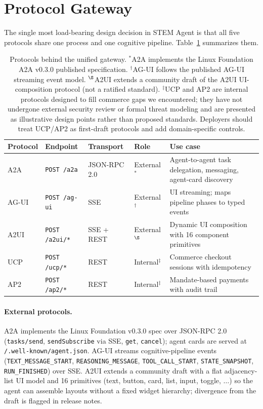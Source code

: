 \documentclass[11pt]{article}
\begin{document}
\section{Protocol Gateway}
\label{sec:protocols}

The single most load-bearing design decision in STEM Agent is that all five protocols share one process and one cognitive pipeline. Table~\ref{tab:protocols} summarizes them.

\begin{table}[t]
  \small
  \centering
  \begin{tabular}{llllp{5.5cm}}
    \toprule
    Protocol & Endpoint & Transport & Role & Use case \\
    \midrule
    A2A  & \texttt{POST /a2a}          & JSON-RPC 2.0 & External$^{\ast}$ & Agent-to-agent task delegation, messaging, agent-card discovery \\
    AG-UI & \texttt{POST /ag-ui}        & SSE           & External$^{\dagger}$ & UI streaming; maps pipeline phases to typed events \\
    A2UI & \texttt{POST /a2ui/*}       & SSE + REST    & External$^{\S}$ & Dynamic UI composition with 16 component primitives \\
    UCP  & \texttt{POST /ucp/*}        & REST          & Internal$^{\ddagger}$ & Commerce checkout sessions with idempotency \\
    AP2  & \texttt{POST /ap2/*}        & REST          & Internal$^{\ddagger}$ & Mandate-based payments with audit trail \\
    \bottomrule
  \end{tabular}
  \caption{Protocols behind the unified gateway. $^{\ast}$A2A implements the Linux Foundation A2A v0.3.0 published specification. $^{\dagger}$AG-UI follows the published AG-UI streaming event model. $^{\S}$A2UI extends a community draft of the A2UI UI-composition protocol (not a ratified standard). $^{\ddagger}$UCP and AP2 are internal protocols designed to fill commerce gaps we encountered; they have not undergone external security review or formal threat modeling and are presented as illustrative design points rather than proposed standards. Deployers should treat UCP/AP2 as first-draft protocols and add domain-specific controls.}
  \label{tab:protocols}
\end{table}

\paragraph{External protocols.} A2A implements the Linux Foundation v0.3.0 spec over JSON-RPC 2.0 (\texttt{tasks/send}, \texttt{sendSubscribe} via SSE, \texttt{get}, \texttt{cancel}); agent cards are served at \texttt{/.well-known/agent.json}. AG-UI streams cognitive-pipeline events (\texttt{TEXT\_MESSAGE\_START}, \texttt{REASONING\_MESSAGE}, \texttt{TOOL\_CALL\_START}, \texttt{STATE\_SNAPSHOT}, \texttt{RUN\_FINISHED}) over SSE. A2UI extends a community draft with a flat adjacency-list UI model and 16 primitives (text, button, card, list, input, toggle, $\ldots$) so the agent can assemble layouts without a fixed widget hierarchy; divergence from the draft is flagged in release notes.
\end{document}
